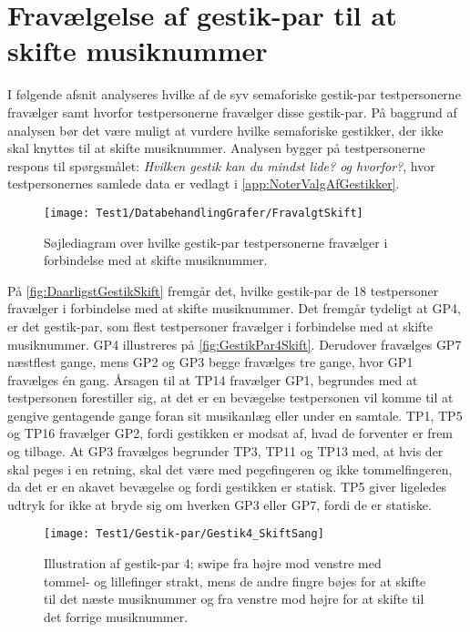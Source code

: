 \section{Fravælgelse af gestik-par til at skifte musiknummer}
\label{app:TestresultaterSkiftDaarlig}
%
I følgende afsnit analyseres hvilke af de syv semaforiske gestik-par testpersonerne fravælger samt hvorfor testpersonerne fravælger disse gestik-par. På baggrund af analysen bør det være muligt at vurdere hvilke semaforiske gestikker, der ikke skal knyttes til at skifte musiknummer. Analysen bygger på testpersonerne respons til spørgsmålet: \textit{Hvilken gestik kan du mindst lide? og hvorfor?}, hvor testpersonernes samlede data er vedlagt i \autoref{app:NoterValgAfGestikker}.
%
\begin{figure}[H]
	\centering
	\texttt{[image: Test1/DatabehandlingGrafer/FravalgtSkift]}
	\caption{Søjlediagram over hvilke gestik-par testpersonerne fravælger i forbindelse med at skifte musiknummer.}
	\label{fig:DaarligstGestikSkift}
\end{figure}
\noindent
%
På \autoref{fig:DaarligstGestikSkift} fremgår det, hvilke gestik-par de 18 testpersoner fravælger i forbindelse med at skifte musiknummer. Det fremgår tydeligt at GP4, er det gestik-par, som flest testpersoner fravælger i forbindelse med at skifte musiknummer. GP4 illustreres på \autoref{fig:GestikPar4Skift}. Derudover fravælges GP7 næstflest gange, mens GP2 og GP3 begge fravælges tre gange, hvor GP1 fravælges én gang. Årsagen til at TP14 fravælger GP1, begrundes med at testpersonen forestiller sig, at det er en bevægelse testpersonen vil komme til at gengive gentagende gange foran sit musikanlæg eller under en samtale. TP1, TP5 og TP16 fravælger GP2, fordi gestikken er modsat af, hvad de forventer er frem og tilbage. At GP3 fravælges begrunder TP3, TP11 og TP13 med, at hvis der skal peges i en retning, skal det være med pegefingeren og ikke tommelfingeren, da det er en akavet bevægelse og fordi gestikken er statisk. TP5 giver ligeledes udtryk for ikke at bryde sig om hverken GP3 eller GP7, fordi de er statiske.
%
\begin{figure}[H]
	\centering
	\texttt{[image: Test1/Gestik-par/Gestik4\_SkiftSang]}
	\caption{Illustration af gestik-par 4; swipe fra højre mod venstre med tommel- og lillefinger strakt, mens de andre fingre bøjes for at skifte til det næste musiknummer og fra venstre mod højre for at skifte til det forrige musiknummer.}
	\label{fig:GestikPar4Skift}
\end{figure}
